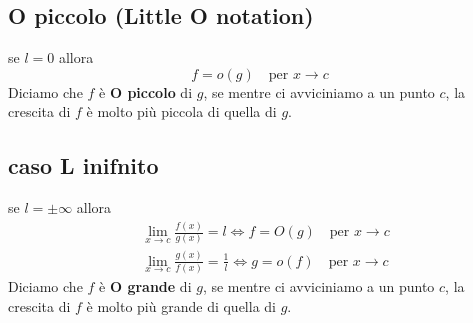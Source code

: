 \documentclass{book}
\begin{document}
\begin{definition}
    \subsection{O piccolo (Little O notation)}
    se \(l = 0\) allora
    \[
        f = o(g) \quad \text{per } x \to c
    \]
    Diciamo che \(f\) è \textbf{O piccolo} di \(g\), se mentre ci avviciniamo a un punto \(c\), la crescita di \(f\) è molto più piccola di quella di \(g\).
\end{definition}

\begin{definition}
    \subsection{caso L inifnito}
    se \(l = \pm \infty\) allora
    \begin{align*}
         & \lim_{x \to c} \frac{f(x)}{g(x)} = l \iff f = O(g) \quad \text{per } x \to c           \\
         & \lim_{x \to c} \frac{g(x)}{f(x)} = \frac{1}{l} \iff g = o(f) \quad \text{per } x \to c
    \end{align*}
    Diciamo che \(f\) è \textbf{O grande} di \(g\), se mentre ci avviciniamo a un punto \(c\), la crescita di \(f\) è molto più grande di quella di \(g\).
\end{definition}
\end{document}
